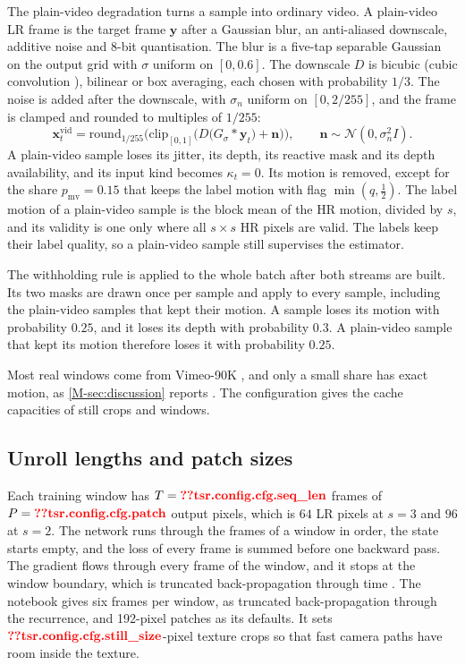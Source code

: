 The plain-video degradation turns a sample into ordinary video. A plain-video LR frame is the target frame $\mathbf{y}$ after a Gaussian blur, an anti-aliased downscale, additive noise and 8-bit quantisation. The blur is a five-tap separable Gaussian on the output grid with $\sigma$ uniform on $[0,0.6]$. The downscale $D$ is bicubic (cubic convolution \cite{keys1981bicubic}), bilinear or box averaging, each chosen with probability $1/3$. The noise is added after the downscale, with $\sigma_n$ uniform on $[0,2/255]$, and the frame is clamped and rounded to multiples of $1/255$:
\begin{equation}\label{eq:tsrm-video}
\mathbf{x}^{\mathrm{vid}}_t=\mathrm{round}_{1/255}\Big(\mathrm{clip}_{[0,1]}\big(D\big(G_\sigma\ast\mathbf{y}_t\big)+\mathbf{n}\big)\Big),\qquad \mathbf{n}\sim\mathcal{N}(0,\sigma_n^2 I).
\end{equation}
A plain-video sample loses its jitter, its depth, its reactive mask and its depth availability, and its input kind becomes $\kappa_t=0$. Its motion is removed, except for the share $p_\mathrm{mv}=0.15$ that keeps the label motion with flag $\min(q,\tfrac12)$. The label motion of a plain-video sample is the block mean of the HR motion, divided by $s$, and its validity is one only where all $s\times s$ HR pixels are valid. The labels keep their label quality, so a plain-video sample still supervises the estimator.

The withholding rule is applied to the whole batch after both streams are built. Its two masks are drawn once per sample and apply to every sample, including the plain-video samples that kept their motion. A sample loses its motion with probability $0.25$, and it loses its depth with probability $0.3$. A plain-video sample that kept its motion therefore loses it with probability $0.25$.

Most real windows come from Vimeo-90K \cite{xue2019vimeo}, and only a small share has exact motion, as \cref{M-sec:discussion} reports \UnderRevision. The configuration gives the cache capacities of  still crops and  windows.

\subsection{Unroll lengths and patch sizes}\label{sec:tsrm-unroll}

Each training window has $T=\Res{tsr.config.cfg.seq_len}$ frames of $P=\Res{tsr.config.cfg.patch}$ output pixels, which is $64$ LR pixels at $s=3$ and $96$ at $s=2$. The network runs through the frames of a window in order, the state starts empty, and the loss of every frame is summed before one backward pass. The gradient flows through every frame of the window, and it stops at the window boundary, which is truncated back-propagation through time \cite{williams1990efficient}. The notebook gives six frames per window, as truncated back-propagation through the recurrence, and 192-pixel patches as its defaults. It sets $\Res{tsr.config.cfg.still_size}$-pixel texture crops so that fast camera paths have room inside the texture.

